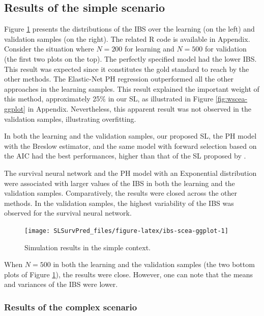 \hypertarget{results-of-the-simple-scenario}{%
\subsection{Results of the simple scenario}\label{results-of-the-simple-scenario}}

Figure \ref{fig:ibs-scea-ggplot} presents the distributions of the IBS over the learning (on the left) and validation samples (on the right). The related \textsf{R} code is available in Appendix. Consider the situation where \(N=200\) for learning and \(N=500\) for validation (the first two plots on the top). The perfectly specified model had the lower IBS. This result was expected since it constitutes the gold standard to reach by the other methods. The Elastic-Net PH regression outperformed all the other approaches in the learning samples. This result explained the important weight of this method, approximately 25\% in our SL, as illustrated in Figure \ref{fig:wscea-ggplot} in Appendix. Nevertheless, this apparent result was not observed in the validation samples, illustrating overfitting.

In both the learning and the validation samples, our proposed SL, the PH model with the Breslow estimator, and the same model with forward selection based on the AIC had the best performances, higher than that of the SL proposed by \citet{westlingPkgsurvSuperLearnerSuperLearning2021}.

The survival neural network and the PH model with an Exponential distribution were associated with larger values of the IBS in both the learning and the validation samples. Comparatively, the results were closed across the other methods. In the validation samples, the highest variability of the IBS was observed for the survival neural network.

\begin{figure}

{\centering \texttt{[image: SLSurvPred\_files/figure-latex/ibs-scea-ggplot-1]} 

}

\caption{Simulation results in the simple context.}\label{fig:ibs-scea-ggplot}
\end{figure}

When \(N=500\) in both the learning and the validation samples (the two bottom plots of Figure \ref{fig:ibs-scea-ggplot}), the results were close. However, one can note that the means and variances of the IBS were lower.

\hypertarget{results-of-the-complex-scenario}{%
\subsubsection{Results of the complex scenario}\label{results-of-the-complex-scenario}}


